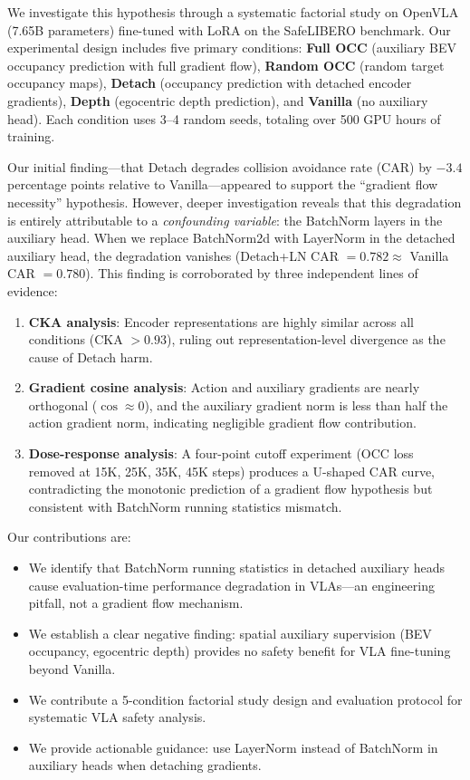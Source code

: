 \documentclass[10pt,letterpaper]{article}
\begin{document}
We investigate this hypothesis through a systematic factorial study on OpenVLA (7.65B parameters) fine-tuned with LoRA on the SafeLIBERO benchmark. Our experimental design includes five primary conditions: \textbf{Full OCC} (auxiliary BEV occupancy prediction with full gradient flow), \textbf{Random OCC} (random target occupancy maps), \textbf{Detach} (occupancy prediction with detached encoder gradients), \textbf{Depth} (egocentric depth prediction), and \textbf{Vanilla} (no auxiliary head). Each condition uses 3--4 random seeds, totaling over 500 GPU hours of training.

Our initial finding---that Detach degrades collision avoidance rate (CAR) by $-3.4$ percentage points relative to Vanilla---appeared to support the ``gradient flow necessity'' hypothesis. However, deeper investigation reveals that this degradation is entirely attributable to a \emph{confounding variable}: the BatchNorm layers in the auxiliary head. When we replace BatchNorm2d with LayerNorm in the detached auxiliary head, the degradation vanishes (Detach+LN CAR $= 0.782 \approx$ Vanilla CAR $= 0.780$). This finding is corroborated by three independent lines of evidence:

\begin{enumerate}
    \item \textbf{CKA analysis}: Encoder representations are highly similar across all conditions (CKA $> 0.93$), ruling out representation-level divergence as the cause of Detach harm.
    \item \textbf{Gradient cosine analysis}: Action and auxiliary gradients are nearly orthogonal ($\cos \approx 0$), and the auxiliary gradient norm is less than half the action gradient norm, indicating negligible gradient flow contribution.
    \item \textbf{Dose-response analysis}: A four-point cutoff experiment (OCC loss removed at 15K, 25K, 35K, 45K steps) produces a U-shaped CAR curve, contradicting the monotonic prediction of a gradient flow hypothesis but consistent with BatchNorm running statistics mismatch.
\end{enumerate}

Our contributions are:
\begin{itemize}
    \item[\textbf{C1.}] We identify that BatchNorm running statistics in detached auxiliary heads cause evaluation-time performance degradation in VLAs---an engineering pitfall, not a gradient flow mechanism.
    \item[\textbf{C2.}] We establish a clear negative finding: spatial auxiliary supervision (BEV occupancy, egocentric depth) provides no safety benefit for VLA fine-tuning beyond Vanilla.
    \item[\textbf{C3.}] We contribute a 5-condition factorial study design and evaluation protocol for systematic VLA safety analysis.
    \item[\textbf{C4.}] We provide actionable guidance: use LayerNorm instead of BatchNorm in auxiliary heads when detaching gradients.
\end{itemize}
\end{document}
